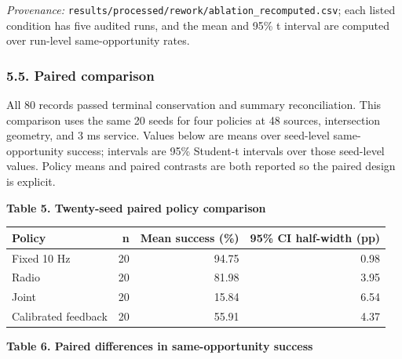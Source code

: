 \documentclass[
]{article}
\newcounter{none} %
\begin{document}
\emph{Provenance:}
\texttt{results/processed/rework/ablation\_recomputed.csv}; each listed
condition has five audited runs, and the mean and 95\% t interval are
computed over run-level same-opportunity rates.

\subsubsection{5.5. Paired comparison}\label{paired-comparison}

All 80 records passed terminal conservation and summary reconciliation.
This comparison uses the same 20 seeds for four policies at 48 sources,
intersection geometry, and 3 ms service. Values below are means over
seed-level same-opportunity success; intervals are 95\% Student-t
intervals over those seed-level values. Policy means and paired
contrasts are both reported so the paired design is explicit.

\textbf{Table 5. Twenty-seed paired policy comparison}

{\def\LTcaptype{none} %
\begin{longtable}[]{@{}lrrr@{}}
\toprule\noalign{}
Policy & n & Mean success (\%) & 95\% CI half-width (pp) \\
\midrule\noalign{}
\endhead
\bottomrule\noalign{}
\endlastfoot
Fixed 10 Hz & 20 & 94.75 & 0.98 \\
Radio & 20 & 81.98 & 3.95 \\
Joint & 20 & 15.84 & 6.54 \\
Calibrated feedback & 20 & 55.91 & 4.37 \\
\end{longtable}
}

\textbf{Table 6. Paired differences in same-opportunity success}
\end{document}
